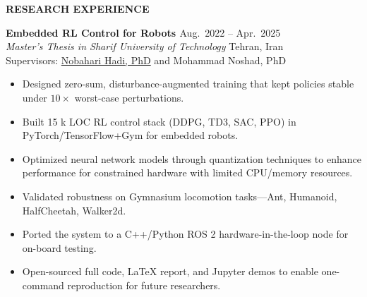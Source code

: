 \documentclass[12pt]{article}
\begin{document}
\vspace{0.2in} %


 \newpage
\begin{center}
	{\noindent \bfseries RESEARCH EXPERIENCE}
\end{center}

\vspace{8pt} %

\noindent

\noindent %
{\bfseries  Embedded RL Control for Robots
\href{https://github.com/CNAVLAB}{\faGithub}
} \hfill Aug.\ 2022 -- Apr.\ 2025 \\[2pt]
\noindent \textit{Master's Thesis in Sharif University of Technology} \hfill Tehran, Iran \\[2pt]
\noindent Supervisors:
\href{https://ae.sharif.edu/~portal/faculty/1091235256}{Nobahari Hadi, PhD} 
{
	and
Mohammad Noshad, PhD
 }{}
\vspace{-4pt}
\begin{itemize}   \itemsep 1pt %
	\item Designed zero-sum, disturbance-augmented training that kept policies stable under $10\times\!$ worst-case perturbations.
	\item Built 15 k LOC RL control stack (DDPG, TD3, SAC, PPO) in PyTorch/TensorFlow+Gym for embedded robots.
	\item Optimized neural network models through quantization techniques to enhance performance for constrained hardware with limited CPU/memory resources.
    \item Validated robustness on Gymnasium locomotion tasks—Ant, Humanoid, HalfCheetah, Walker2d.%
    \item Ported the system to a C++/Python ROS 2 hardware-in-the-loop node for on-board testing.%
    \item Open-sourced full code, LaTeX report, and Jupyter demos to enable one-command reproduction for future researchers.
\end{itemize}
\end{document}
